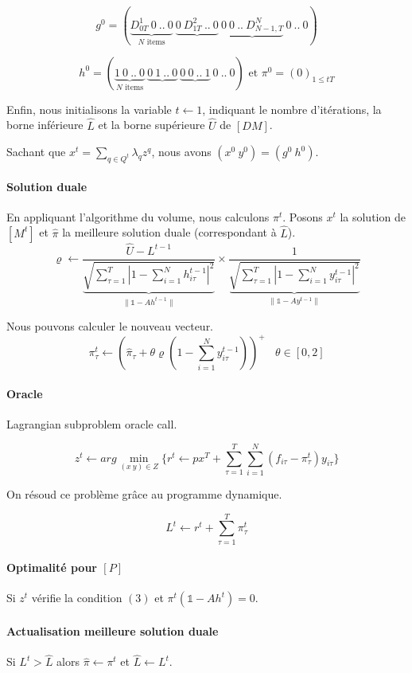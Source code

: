 \documentclass[12pt,a4paper]{article}
\begin{document}
 $$ g^0=(\underbrace{D^1_{0T}~0~..~0}_{N \text{ items}} ~ \underbrace{0~D^2_{1T}~..~0} ~ \underbrace{0~0~..~D^N_{N-1,T}} ~0~..~0) $$ 
 
 $$h^0=(\underbrace{1~0~..~0}_{N \text{ items}} ~ \underbrace{0~1~..~0} ~ \underbrace{0~0~..~1} ~0~..~0) \text{ et } \pi^0=(0)_{1 \leq t T} $$
 
 Enfin, nous initialisons la variable $t \leftarrow 1$, indiquant le nombre d'itérations, la borne inférieure $\hat{L}$ et la borne supérieure $\hat{U}$ de $[DM]$. \medbreak
 
 Sachant que $x^t = \sum_{q \in Q^t} \lambda_q z^q$, nous avons $(x^0~y^0) = (g^0~h^0)$.
 
 \paragraph{Solution duale} En appliquant l'algorithme du volume, nous calculons $\pi^{t}$. Posons $x^t$ la solution de $[M^t]$ et $\hat{\pi}$ la meilleure solution duale (correspondant à $\hat{L}$).
 $$\varrho \leftarrow  \dfrac{\hat{U}-L^{t-1}}{\underbrace{\sqrt{\sum_{\tau=1}^T  
 |1 - \sum_{i=1}^N h_{i \tau}^{t-1}|^2 }}_{\parallel \mathds{1} - Ah^{t-1} \parallel}} \times \dfrac{1}{\underbrace{\sqrt{\sum_{\tau=1}^T |1 - \sum_{i=1}^N y_{i \tau}^{t-1}|^2 }}_{\parallel \mathds{1} - Ay^{t-1} \parallel}}$$
 
 Nous pouvons calculer le nouveau vecteur.
 $$ \pi^t_\tau \leftarrow (\hat{\pi}_\tau + \theta \varrho (1-\sum_{i=1}^Ny^{t-1}_{i\tau}))^+ ~~~~ \theta \in [0,2] $$
 
 \paragraph{Oracle} Lagrangian subproblem oracle call.
 
 $$ z^t \leftarrow arg\min_{(x~y)\in Z}\{ r^t \leftarrow px^T +  \sum_{\tau=1}^T \sum_{i=1}^N ( f_{i\tau} - \pi_{\tau}^t) y_{i\tau} \}$$
 
 On résoud ce problème grâce au programme dynamique.
 
 $$L^t \leftarrow r^t + \sum_{\tau=1}^T \pi_{\tau}^t$$
 
 \paragraph{Optimalité pour $[P]$ } Si $z^t$ vérifie la condition $(3)$ et $\pi^t(\mathds{1} - Ah^t)= 0$.
 
 \paragraph{Actualisation meilleure solution duale} Si $L^t > \hat{L}$ alors $\hat{\pi}\leftarrow \pi^t$ et $\hat{L} \leftarrow L^t$.
 
\end{document}
